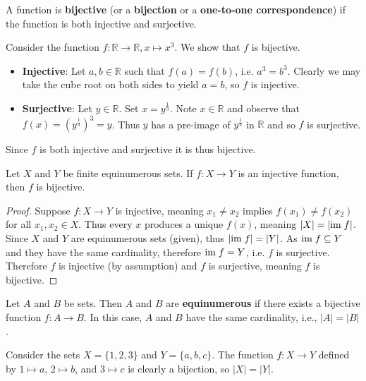 \begin{definition}
    A function is \textbf{bijective} (or a \textbf{bijection} or a \textbf{one-to-one correspondence}) if the function is both injective and surjective.
\end{definition}

\newpage

\begin{example}
    Consider the function $f: \mathbb{R} \to \mathbb{R}, x \mapsto x^3$. We show that $f$ is bijective.
    \begin{itemize}
        \item \textbf{Injective}: Let $a, b \in \mathbb{R}$ such that $f(a) = f(b)$, i.e. $a^3 = b^3$. Clearly we may take the cube root on both sides to yield $a = b$, so $f$ is injective.
        \item \textbf{Surjective}: Let $y \in \mathbb{R}$. Set $x=y^{\frac13}$. Note $x \in \mathbb{R}$ and observe that $f(x) = \left(y^{\frac13}\right)^3 = y$. Thus $y$ has a pre-image of $y^{\frac13}$ in $\mathbb{R}$ and so $f$ is surjective.
    \end{itemize}
    Since $f$ is both injective and surjective it is thus bijective.
\end{example}

\begin{proposition}
    Let $X$ and $Y$ be finite equinumerous sets. If $f: X \to Y$ is an injective function, then $f$ is bijective.
\end{proposition}
\begin{proof}
    Suppose $f: X \to Y$ is injective, meaning $x_1 \neq x_2$ implies $f(x_1) \neq f(x_2)$ for all $x_1, x_2 \in X$. Thus every $x$ produces a unique $f(x)$, meaning $|X| = |\mathrm{im}\; f|$. Since $X$ and $Y$ are equinumerous sets (given), thus $|\mathrm{im}\; f| = |Y|$. As $\mathrm{im}\; f \subseteq Y$ and they have the same cardinality, therefore $\mathrm{im}\; f = Y$, i.e. $f$ is surjective. Therefore $f$ is injective (by assumption) and $f$ is surjective, meaning $f$ is bijective.
\end{proof}

\begin{definition}
    Let $A$ and $B$ be sets. Then $A$ and $B$ are \textbf{equinumerous} if there exists a bijective function $f: A \to B$. In this case, $A$ and $B$ have the same cardinality, i.e., $|A| = |B|$.
\end{definition}
\begin{example}
    Consider the sets $X = \{1, 2, 3\}$ and $Y = \{a, b, c\}$. The function $f: X \to Y$ defined by $1 \mapsto a$, $2 \mapsto b$, and $3 \mapsto c$ is clearly a bijection, so $|X| = |Y|$.
\end{example}

